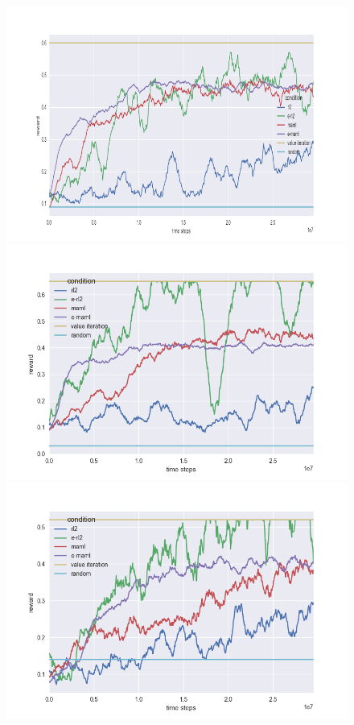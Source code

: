 \documentclass{article} %
\begin{document}
\begin{figure}[H]
\begin{center}
\includegraphics[scale=0.16]{bradly_curves/64testgrid0_scaled.png}%
\includegraphics[scale=0.16]{bradly_curves/64testgrid1.png}
\includegraphics[scale=0.16]{bradly_curves/64testgrid2.png}%

\end{center}
\end{figure}
\end{document}
